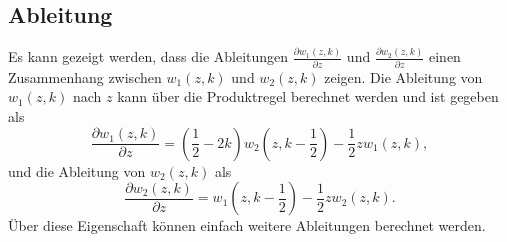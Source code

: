 \subsection{Ableitung}
Es kann gezeigt werden, dass die Ableitungen $\frac{\partial w_1(z,k)}{\partial z}$ und $\frac{\partial w_2(z,k)}{\partial z}$ einen Zusammenhang zwischen $w_1(z,k)$ und $w_2(z,k)$ zeigen. Die Ableitung von $w_1(z,k)$ nach $z$ kann über die Produktregel berechnet werden und ist gegeben als
\begin{equation}
	\frac{\partial w_1(z,k)}{\partial z} = \left (\frac{1}{2} - 2k \right ) w_2(z, k -\frac{1}{2}) - \frac{1}{2} z w_1(z,k),
\end{equation} 
und die Ableitung von $w_2(z,k)$ als
\begin{equation}
	\frac{\partial w_2(z,k)}{\partial z} = w_1(z, k -\frac{1}{2}) - \frac{1}{2} z w_2(z,k).
\end{equation}
Über diese Eigenschaft können einfach weitere Ableitungen berechnet werden. 

